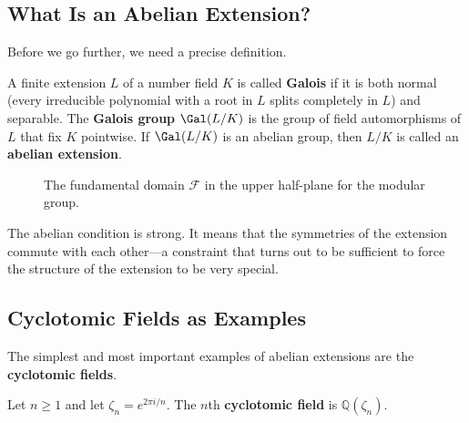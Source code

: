 \subsection{What Is an Abelian Extension?}

Before we go further, we need a precise definition.

\begin{definition}
A finite extension $L$ of a number field $K$ is called \textbf{Galois} if it is both normal (every irreducible polynomial with a root in $L$ splits completely in $L$) and separable. The \textbf{Galois group} $\Gal(L/K)$ is the group of field automorphisms of $L$ that fix $K$ pointwise. If $\Gal(L/K)$ is an abelian group, then $L/K$ is called an \textbf{abelian extension}.
\end{definition}

\begin{figure}[htbp]
\centering
{}
\caption{The fundamental domain $\mathcal{F}$ in the upper half-plane for the modular group.}
\label{fig:fundamental-domain}
\end{figure}

The abelian condition is strong. It means that the symmetries of the extension commute with each other---a constraint that turns out to be sufficient to force the structure of the extension to be very special.

\subsection{Cyclotomic Fields as Examples}

The simplest and most important examples of abelian extensions are the \textbf{cyclotomic fields}.

\begin{definition}
Let $n \geq 1$ and let $\zeta_n = e^{2\pi i/n}$. The $n$th \textbf{cyclotomic field} is $\mathbb{Q}(\zeta_n)$.
\end{definition}

